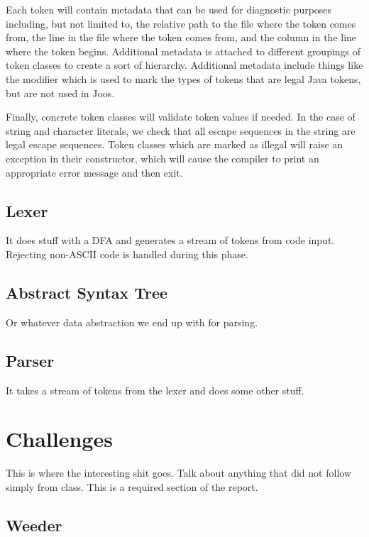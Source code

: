 \documentclass[pdftex,11pt,a4paper]{article}
\begin{document}
Each token will contain metadata that can be used for diagnostic
purposes including, but not limited to, the relative path to the file
where the token comes from, the line in the file where the token comes
from, and the column in the line where the token begins. Additional
metadata is attached to different groupings of token classes to create
a sort of hierarchy. Additional metadata include things like the
 modifier which is used to mark the types of tokens
that are legal Java tokens, but are not used in Joos.

Finally, concrete token classes will validate token values if
needed. In the case of string and character literals, we check that
all escape sequences in the string are legal escape sequences. Token
classes which are marked as illegal will raise an exception in their
constructor, which will cause the compiler to print an appropriate
error message and then exit.


\subsection{Lexer}

It does stuff with a DFA and generates a stream of tokens from code
input. Rejecting non-ASCII code is handled during this phase.


\subsection{Abstract Syntax Tree}

Or whatever data abstraction we end up with for parsing.


\subsection{Parser}

It takes a stream of tokens from the lexer and does some other stuff.


\section{Challenges}


This is where the interesting shit goes. Talk about anything that did
not follow simply from class. This is a required section of the report.


\subsection{Weeder}
\end{document}
